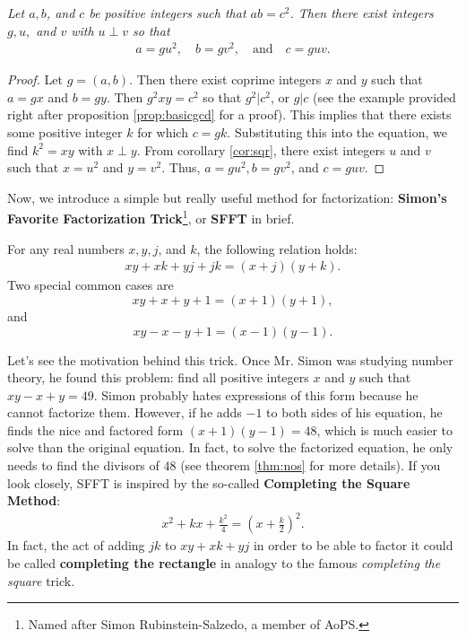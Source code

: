 \documentclass{subfile}
\begin{document}
	\begin{theorem}\slshape
		Let $a,b$, and $c$ be positive integers such that $ab=c^2$. Then there exist integers $g,u,$ and $v$ with $u\perp v$ so that
		\begin{align*}
			a = gu^2,\quad b = gv^2, \quad \text{and} \quad c = guv.
		\end{align*}
	\end{theorem}

	\begin{proof}
		Let $g=(a,b)$. Then there exist coprime integers $x$ and $y$ such that $a=gx$ and $b=gy$. Then $g^2xy=c^2$ so that $g^2|c^2$, or $g|c$ (see the example provided right after proposition \eqref{prop:basicgcd} for a proof). This implies that there exists some positive integer $k$ for which $c=gk$. Substituting this into the equation, we find $k^2=xy$ with $x\perp y$. From corollary \eqref{cor:sqr}, there exist integers $u$ and $v$ such that $x=u^2$ and $y=v^2$. Thus, $a=gu^2,b=gv^2$, and $c=guv$.
	\end{proof}
	Now, we introduce a simple but really useful method for factorization: \textbf{Simon's Favorite Factorization Trick}\footnote{Named after Simon Rubinstein-Salzedo, a member of AoPS.}, or \textbf{SFFT} in brief.
	\begin{proposition}[SFFT]
		For any real numbers $x,y, j$, and $k$, the following relation holds:
		\begin{align*}
			xy+xk+yj+jk=(x+j)(y+k).
		\end{align*}
		Two special common cases are $$xy + x + y + 1 = (x+1)(y+1),$$ and $$xy - x - y +1 = (x-1)(y-1).$$
	\end{proposition}
	Let's see the motivation behind this trick. Once Mr. Simon was studying number theory, he found this problem: find all positive integers $x$ and $y$ such that $xy-x+y=49$. Simon probably hates expressions of this form because he cannot factorize them. However, if he adds $-1$ to both sides of his equation, he finds the nice and factored form $(x+1)(y-1)=48$, which is much easier to solve than the original equation. In fact, to solve the factorized equation, he only needs to find the divisors of $48$ (see theorem \eqref{thm:nos} for more details). If you look closely, SFFT is inspired by the so-called \textbf{Completing the Square Method}:
	\begin{align*}
		x^2+kx+\frac{k^2}{4}=\left(x+\frac{k}{2}\right)^2.
	\end{align*}
	In fact, the act of adding ${jk}$ to ${xy}+{xk}+{yj}$ in order to be able to factor it could be called \textbf{completing the rectangle} in analogy to the famous \textit{completing the square} trick.
\end{document}
